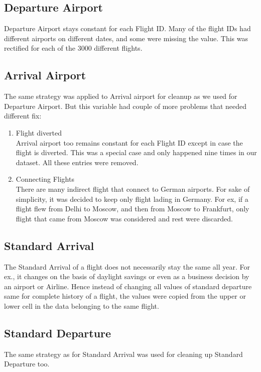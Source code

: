\subsection{Departure Airport}
Departure Airport stays constant for each Flight ID. Many of the flight IDs had different airports on different dates, and some were missing the value. This was rectified for each of the 3000 different flights.

\subsection{Arrival Airport}
The same strategy was applied to Arrival airport for cleanup as we used for Departure Airport. But this variable had couple of more problems that needed different fix:
\begin{enumerate}
    \item Flight diverted
    \\Arrival airport too remains constant for each Flight ID except in case the flight is diverted. This was a special case and only happened nine times in our dataset. All these entries were removed. \item Connecting Flights
    \\There are many indirect flight that connect to German airports. For sake of simplicity, it was decided to keep only flight lading in Germany. For ex, if a flight flew from Delhi to Moscow, and then from Moscow to Frankfurt, only flight that came from Moscow was considered and rest were discarded. 
\end{enumerate} 

\subsection{Standard Arrival}
The Standard Arrival of a flight does not necessarily stay the same all year. For ex., it changes on the basis of daylight savings or even as a business decision by an airport or Airline. Hence instead of changing all values of standard departure same for complete history of a flight, the values were copied from the upper or lower cell in the data belonging to the same flight. 

\subsection{Standard Departure}
The same strategy as for Standard Arrival was used for cleaning up Standard Departure too.

